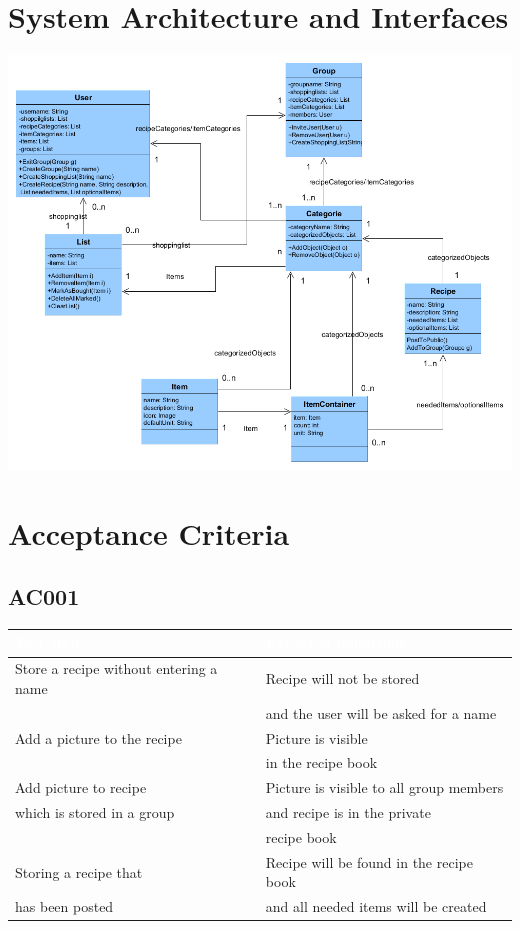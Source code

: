 \documentclass[12pt]{article}
\theoremstyle{definition}
\begin{document}
\pagebreak

\section{System Architecture and Interfaces}

\includegraphics[scale=.5]{UMLClassDiagram.png}

\pagebreak

\section{Acceptance Criteria}

\subsection{AC001}

\begin{tabular}{|l|l|}
\hline 
\cellcolor[gray]{0.5}\textcolor{white}{Test step} & \cellcolor[gray]{0.5}\textcolor{white}{Expected behaviour} \\ \hline
Store a recipe without entering a name & Recipe will not be stored \\ 
 & and the user will be asked for a name \\ \hline
Add a picture to the recipe & Picture is visible \\
 & in the recipe book \\ \hline
Add picture to recipe & Picture is visible to all group members\\
which is stored in a group & and recipe is in the private \\ 
& recipe book \\ \hline
Storing a recipe that & Recipe will be found in the recipe book\\
has been posted & and all needed items will be created\\ \hline
\end{tabular}
\end{document}
